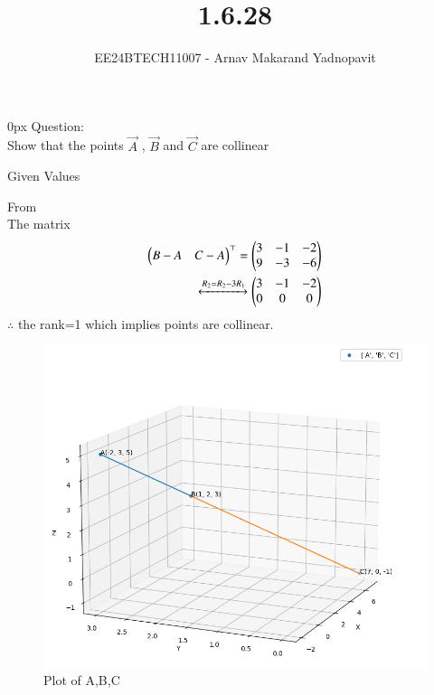 \documentclass[journal]{IEEEtran}
\begin{document}

\title{1.6.28}
\author{EE24BTECH11007 - Arnav Makarand Yadnopavit}
{\let\newpage\relax\maketitle}
\renewcommand{\thefigure}{\theenumi}
\renewcommand{\thetable}{\theenumi}
\setlength{\intextsep}{10pt} %
\renewcommand{\thetable}{\theenumi}
\parindent 0px
Question:\\
Show that the points $\vec{A}$ , $\vec{B}$  and $\vec{C}$  are collinear\\
\solution
\begin{table}[h]
    \centering
    
    \caption{Given Values}
    \label{tab:1}
\end{table}
From \\
The matrix
\begin{align}
\begin{pmatrix}B-A & C-A\end{pmatrix}^\top=\begin{pmatrix}3 & -1 & -2 \\ 9 & -3 & -6\end{pmatrix}\\
\xleftrightarrow[]{R_2=R_2-3R_1} 
\begin{pmatrix}3 & -1 & -2 \\ 0 & 0 & 0\end{pmatrix}
\end{align}
$\therefore$ the rank=1 which implies points are collinear.
\begin{figure}[h]
    \centering
    \includegraphics[width=\columnwidth]{figs/fig.png}
    \caption{Plot of A,B,C}
 \end{figure}
\end{document}

